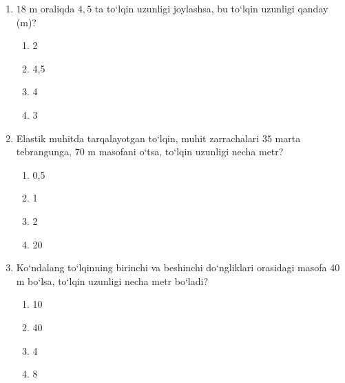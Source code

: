 \begin{enumerate}

\begin{enumerate}[label=\Alph*)]
\item 0,5 m
\item 1 m
\item 2 m
\item 4 m

\end{enumerate}

\item $18$ m oraliqda $4,5$ ta to‘lqin uzunligi joylashsa, bu to‘lqin uzunligi qanday (m)?
\begin{enumerate}[label=\Alph*)]
\item 2
\item 4,5
\item 4
\item 3

\end{enumerate}

\item Elastik muhitda tarqalayotgan to‘lqin, muhit zarrachalari $35$ marta tebrangunga, $70$ m masofani o‘tsa, to‘lqin uzunligi necha metr?
\begin{enumerate}[label=\Alph*)]
\item 0,5
\item 1
\item 2
\item 20

\end{enumerate}

\item Ko‘ndalang to‘lqinning birinchi va beshinchi do‘ngliklari orasidagi masofa 40 m bo‘lsa, to‘lqin uzunligi necha metr bo‘ladi?
\begin{enumerate}[label=\Alph*)]
\item 10
\item 40
\item 4
\item 8

\end{enumerate}


\end{enumerate}
